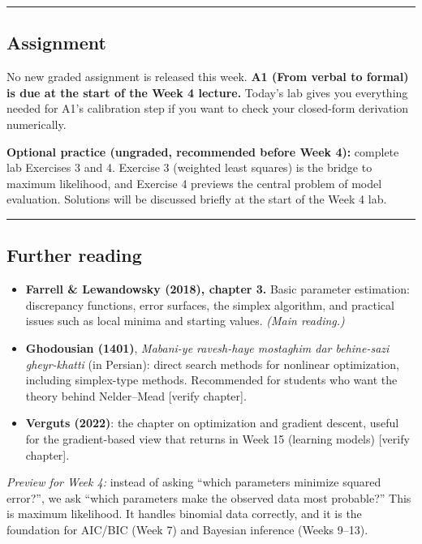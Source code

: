\begin{center}\rule{0.5\linewidth}{0.5pt}\end{center}

\subsection{Assignment}

No new graded assignment is released this week. \textbf{A1 (From verbal
to formal) is due at the start of the Week 4 lecture.} Today's lab gives
you everything needed for A1's calibration step if you want to check
your closed-form derivation numerically.

\textbf{Optional practice (ungraded, recommended before Week 4):}
complete lab Exercises 3 and 4. Exercise 3 (weighted least squares) is
the bridge to maximum likelihood, and Exercise 4 previews the central
problem of model evaluation. Solutions will be discussed briefly at the
start of the Week 4 lab.

\begin{center}\rule{0.5\linewidth}{0.5pt}\end{center}

\subsection{Further reading}

\begin{itemize}
\tightlist
\item
  \textbf{Farrell \& Lewandowsky (2018), chapter 3.} Basic parameter
  estimation: discrepancy functions, error surfaces, the simplex
  algorithm, and practical issues such as local minima and starting
  values. \emph{(Main reading.)}
\item
  \textbf{Ghodousian (1401)}, \emph{Mabani-ye ravesh-haye mostaghim dar
  behine-sazi gheyr-khatti} (in Persian): direct search methods for
  nonlinear optimization, including simplex-type methods. Recommended
  for students who want the theory behind Nelder--Mead {[}verify
  chapter{]}.
\item
  \textbf{Verguts (2022)}: the chapter on optimization and gradient
  descent, useful for the gradient-based view that returns in Week 15
  (learning models) {[}verify chapter{]}.
\end{itemize}

\emph{Preview for Week 4:} instead of asking ``which parameters minimize
squared error?'', we ask ``which parameters make the observed data most
probable?'' This is maximum likelihood. It handles binomial data
correctly, and it is the foundation for AIC/BIC (Week 7) and Bayesian
inference (Weeks 9--13).
